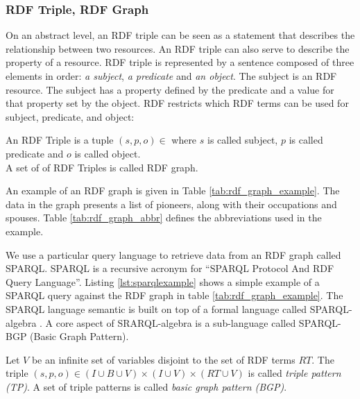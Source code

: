 \subsubsection{RDF Triple, RDF Graph}
\label{sec:rdf_triples}
On an abstract level, an RDF triple can be seen as a statement that describes the relationship between two resources. An RDF triple can also serve to describe the property of a resource. RDF triple is represented by a sentence composed of three elements in order: \textit{a subject}, \textit{a predicate} and \textit{an object}.
The subject is an RDF resource. The subject has a property defined by the predicate and a value for that property set by the object.
RDF restricts which RDF terms can be used for subject, predicate, and object:

\begin{definition}
An RDF Triple is a tuple $(s, p, o) \in  $ where $s$ is called subject, $p$ is called predicate and $o$ is called object. \\
A set of of RDF Triples is called RDF graph.
\end{definition}

\begin{example}
	An example of an RDF graph is given in Table \ref{tab:rdf_graph_example}. 
	The data in the graph presents a list of pioneers, along with their occupations and spouses. Table \ref{tab:rdf_graph_abbr} defines the abbreviations used in the example. \\
\end{example}

We use a particular query language to retrieve data from an RDF graph called SPARQL. SPARQL \cite{Hitzler} is a recursive acronym for “SPARQL Protocol And RDF Query Language”. Listing \ref{lst:sparqlexample} shows a simple example of a SPARQL query against the RDF graph in table \ref{tab:rdf_graph_example}. The SPARQL language semantic is built on top of a formal language called SPARQL-algebra \cite{Hitzler}. A core aspect of SRARQL-algebra is a sub-language called SPARQL-BGP (Basic Graph Pattern). \\

\begin{definition}
Let $V$ be an infinite set of variables disjoint to the set of RDF terms $RT$. The triple $(s, p, o) \in ( I \cup B \cup V) \times (I \cup V) \times (RT \cup V)$ is called \textit{triple pattern (TP)}. A set of triple patterns is called \textit{basic graph pattern (BGP)}.
\end{definition}

